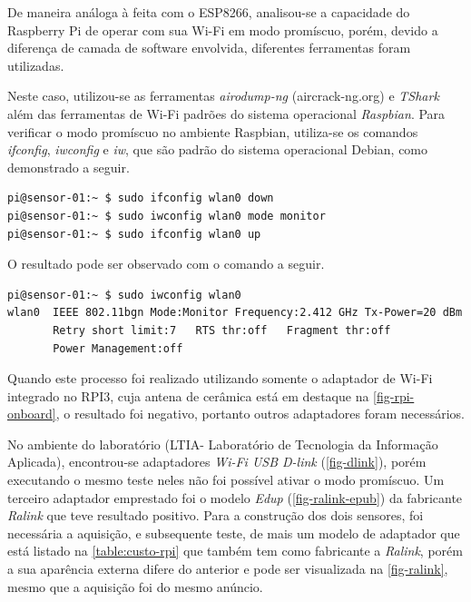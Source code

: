 De maneira análoga à feita com o ESP8266, analisou-se a capacidade do Raspberry Pi
de operar com sua Wi-Fi em modo promíscuo, porém, devido a diferença de camada
de software envolvida, diferentes ferramentas foram utilizadas.

Neste caso, utilizou-se as ferramentas \emph{airodump-ng} (aircrack-ng.org) e \emph{TShark} além das ferramentas de
Wi-Fi padrões do sistema operacional \emph{Raspbian}. Para verificar o modo
promíscuo no ambiente Raspbian, utiliza-se os comandos \emph{ifconfig},
\emph{iwconfig} e \emph{iw}, que são padrão do sistema operacional Debian, como
demonstrado a seguir.

\begin{lstlisting}[language=bash,caption={Ativação do modo monitor},label=code-iw-monitor]
pi@sensor-01:~ $ sudo ifconfig wlan0 down
pi@sensor-01:~ $ sudo iwconfig wlan0 mode monitor
pi@sensor-01:~ $ sudo ifconfig wlan0 up
\end{lstlisting}

O resultado pode ser observado com o comando a seguir.

\begin{lstlisting}[language=bash,caption={iwconfig com modo monitor},label=code-check-monitor]
pi@sensor-01:~ $ sudo iwconfig wlan0
wlan0  IEEE 802.11bgn Mode:Monitor Frequency:2.412 GHz Tx-Power=20 dBm
	   Retry short limit:7   RTS thr:off   Fragment thr:off
       Power Management:off
\end{lstlisting}

Quando este processo foi realizado utilizando somente o adaptador de Wi-Fi
integrado no RPI3, cuja antena de cerâmica está em destaque na
\autoref{fig-rpi-onboard}, o resultado foi negativo, portanto outros adaptadores
foram necessários.

No ambiente do laboratório (LTIA- Laboratório de Tecnologia da Informação Aplicada),
encontrou-se adaptadores \emph{Wi-Fi USB D-link}
(\autoref{fig-dlink}), porém executando o mesmo teste neles não foi possível
ativar o modo promíscuo. Um terceiro adaptador emprestado foi o modelo \emph{Edup} (\autoref{fig-ralink-epub}) da
fabricante \emph{Ralink} que teve resultado
positivo. Para a construção dos dois sensores, foi necessária a aquisição, e
subsequente teste, de mais um modelo de adaptador que está listado na
\autoref{table:custo-rpi} que também tem como fabricante a \emph{Ralink}, porém a sua
aparência externa difere do anterior e pode ser visualizada na
\autoref{fig-ralink}, mesmo que a aquisição foi do mesmo anúncio.


